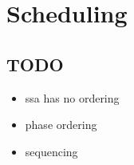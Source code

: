 \applynumberofpages\chapter{Scheduling }
\section{TODO}

\begin{itemize}
	\item ssa has no ordering
	\item phase ordering
	\item sequencing
\end{itemize}
